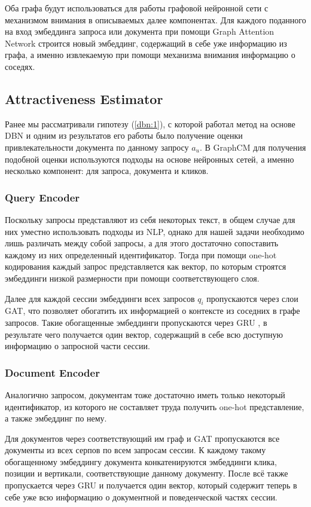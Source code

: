 \documentclass[diploma]{nanolab2015}
\begin{document}
Оба графа будут использоваться для работы графовой нейронной сети с механизмом внимания \cite{GAT} в описываемых далее компонентах. Для каждого поданного на вход эмбеддинга запроса или документа при помощи Graph Attention Network строится новый эмбеддинг, содержащий в себе уже информацию из графа, а именно извлекаемую при помощи механизма внимания \cite{Attention} информацию о соседях.

\subsection{Attractiveness Estimator}
Ранее мы рассматривали гипотезу (\ref{dbn:1}), с которой работал метод на основе DBN и одним из результатов его работы было получение оценки привлекательности документа по данному запросу $a_u$. В GraphCM для получения подобной оценки используются подходы на основе нейронных сетей, а именно несколько компонент: для запроса, документа и кликов.

\subsubsection{Query Encoder}
Поскольку запросы представляют из себя некоторых текст, в общем случае для них уместно использовать подходы из NLP, однако для нашей задачи необходимо лишь различать между собой запросы, а для этого достаточно сопоставить каждому из них определенный идентификатор. Тогда при помощи one-hot кодирования каждый запрос представляется как вектор, по которым строятся эмбеддинги низкой размерности при помощи соответствующего слоя.

Далее для каждой сессии эмбеддинги всех запросов $q_i$ пропускаются через слои GAT, что позволяет обогатить их информацией о контексте из соседних в графе запросов. Такие обогащенные эмбеддинги пропускаются через GRU \cite{GRU}, в результате чего получается один вектор, содержащий в себе всю доступную информацию о запросной части сессии.

\subsubsection{Document Encoder}
Аналогично запросом, документам тоже достаточно иметь только некоторый идентификатор, из которого не составляет труда получить one-hot представление, а также эмбеддинг по нему.

Для документов через соответствующий им граф и GAT пропускаются все документы из всех серпов по всем запросам сессии. К каждому такому обогащенному эмбеддингу документа конкатенируются эмбеддинги клика, позиции и вертикали, соответствующие данному документу. После всё также пропускается через GRU и получается один вектор, который содержит теперь в себе уже всю информацию о документной и поведенческой частях сессии.
\end{document}
